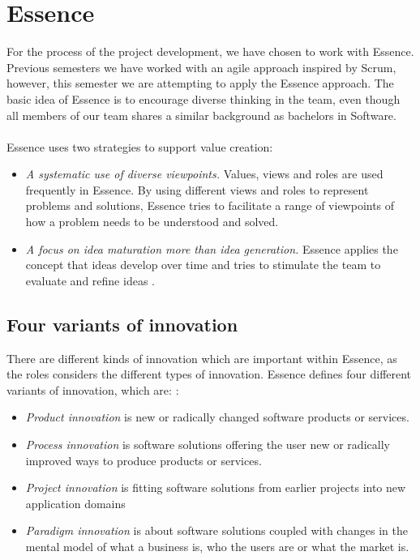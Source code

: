\section{Essence}
For the process of the project development, we have chosen to work with Essence. 
Previous semesters we have worked with an agile approach inspired by Scrum, however, this semester we are attempting to apply the Essence approach.
The basic idea of Essence is to encourage diverse thinking in the team, even though all members of our team shares a similar background as bachelors in Software.
\\\\
Essence uses two strategies to support value creation:
\begin{itemize}
    \item \textit{A systematic use of diverse viewpoints.} 
    Values, views and roles are used frequently in Essence. 
    By using different views and roles to represent problems and solutions, Essence tries to facilitate a range of viewpoints of how a problem needs to be understood and solved.
    \item \textit{A focus on idea maturation more than idea generation.}
    Essence applies the concept that ideas develop over time and tries to stimulate the team to evaluate and refine ideas \autocite{Essence}.
\end{itemize}

\subsection{Four variants of innovation}
There are different kinds of innovation which are important within Essence, as the roles considers the different types of innovation. 
Essence defines four different variants of innovation, which are: \autocite{Essence}:
\begin{itemize}
    \item \textit{Product innovation} is new or radically changed software products or services. 
    \item \textit{Process innovation} is software solutions offering the user new or radically improved ways to produce products or services.
    \item \textit{Project innovation} is fitting software solutions from earlier projects into new application domains
    \item \textit{Paradigm innovation} is about software solutions coupled with changes in the mental model of what a business is, who the users are or what the market is.
\end{itemize}

